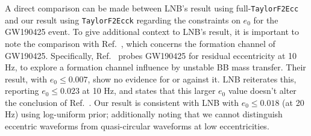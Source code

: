 \documentclass[aps,prd,twocolumn,superscriptaddress,groupedaddress,nofootinbib,showpacs,eqsecnum,useAms]{revtex4-2}
\begin{document}

A direct comparison can be made between LNB's result using full-\texttt{TaylorF2Ecc} and our result using \texttt{TaylorF2Ecck} regarding the constraints on $e_0$ for the GW190425 event. To give additional context to LNB's result, it is important to note the comparison with Ref.~\cite{Romero_Shaw_2020_GW190521}, which concerns the formation channel of GW190425. 
Specifically, Ref.~\cite{Romero_Shaw_2020_GW190521} probes GW190425 for residual eccentricity at 10 Hz, to explore a formation channel influence by unstable BB mass transfer. Their result, with $e_0\leq 0.007$, show no evidence for or against it. LNB reiterates this, reporting $e_0\leq 0.023$ at 10 Hz, and states that this larger $e_0$ value doesn't alter the conclusion of Ref.~\cite{Romero_Shaw_2020_GW190521}. Our result is consistent with LNB with $e_0\leq0.018$ (at 20 Hz) using log-uniform prior; additionally noting that we cannot distinguish eccentric waveforms from quasi-circular waveforms at low eccentricities.
\end{document}
